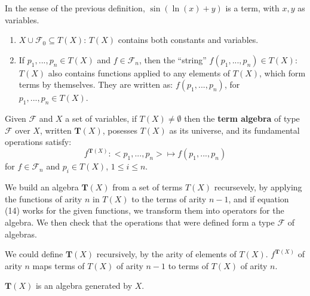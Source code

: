 \begin{remark}
  \begin{example}
    In the sense of the previous definition, $\sin(\ln(x) + y)$ is a term, with $x,y$ as variables.
  \end{example}
\end{remark}

\begin{interpretation}
  \begin{enumerate}
  \item $X \cup \mathcal{F}_0 \subseteq T(X)$: $T(X)$ contains both constants and variables.
  \item If $p_1,...,p_n \in T(X)$ and $f \in \mathcal{F}_n$, then the ``string''
    $f(p_1,...,p_n) \in T(X)$: $T(X)$ also contains functions applied to any
    elements of $T(X)$, which form terms by themselves. They are written as:
    $f(p_1,...,p_n)$, for $p_1,...,p_n \in T(X)$.
  \end{enumerate}
\end{interpretation}

\begin{definition}
  Given $\mathcal{F}$ and $X$ a set of variables, if $T(X) \neq \emptyset$ then
  the \textbf{term algebra} of type $\mathcal{F}$ over $X$, written
  $\boldsymbol{T}(X)$, posesses $T(X)$ as its universe, and its fundamental
  operations satisfy:
  \begin{equation}
    f^{\boldsymbol{T}(X)}: <p_1, ..., p_n> \mapsto f(p_1,...,p_n)
  \end{equation}
  for $f \in \mathcal{F}_n$ and $p_i \in T(X)$, $1 \leq i \leq n$.
\end{definition}

\begin{interpretation}
  We build an algebra $\boldsymbol{T}(X)$ from a set of terms $T(X)$
  recursevely, by applying the functions of arity $n$ in $T(X)$ to the terms of
  arity $n-1$, and if equation (14) works for the given functions, we transform
  them into operators for the algebra. We then check that the operations that
  were defined form a type $\mathcal{F}$ of algebras.
\end{interpretation}

\begin{remark}
  We could define $\boldsymbol{T}(X)$ recursively, by the arity of elements of
  $T(X)$. $f^{\boldsymbol{T}(X)}$ of arity $n$ maps terms of $T(X)$ of arity
  $n-1$ to terms of $T(X)$ of arity $n$.
\end{remark}

\begin{prop}
  $\boldsymbol{T}(X)$ is an algebra generated by $X$.
\end{prop}

